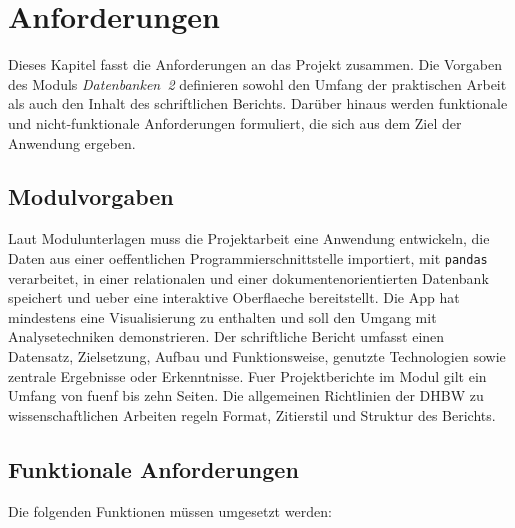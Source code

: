 \section{Anforderungen}
\label{sec:anforderungen}

Dieses Kapitel fasst die Anforderungen an das Projekt zusammen. Die Vorgaben des Moduls \emph{Datenbanken 2} definieren sowohl den Umfang der praktischen Arbeit als auch den Inhalt des schriftlichen Berichts. Darüber hinaus werden funktionale und nicht‑funktionale Anforderungen formuliert, die sich aus dem Ziel der Anwendung ergeben.

\subsection{Modulvorgaben}

Laut Modulunterlagen muss die Projektarbeit eine Anwendung entwickeln, die Daten aus einer oeffentlichen Programmierschnittstelle importiert, mit \texttt{pandas} verarbeitet, in einer relationalen und einer dokumentenorientierten Datenbank speichert und ueber eine interaktive Oberflaeche bereitstellt. Die App hat mindestens eine Visualisierung zu enthalten und soll den Umgang mit Analysetechniken demonstrieren. Der schriftliche Bericht umfasst einen Datensatz, Zielsetzung, Aufbau und Funktionsweise, genutzte Technologien sowie zentrale Ergebnisse oder Erkenntnisse. Fuer Projektberichte im Modul gilt ein Umfang von fuenf bis zehn Seiten. Die allgemeinen Richtlinien der DHBW zu wissenschaftlichen Arbeiten regeln Format, Zitierstil und Struktur des Berichts\cite{dhbw_guidelines}.

\subsection{Funktionale Anforderungen}

Die folgenden Funktionen müssen umgesetzt werden:

